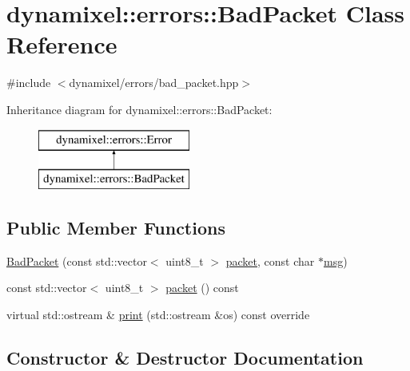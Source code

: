 \hypertarget{classdynamixel_1_1errors_1_1_bad_packet}{}\section{dynamixel\+:\+:errors\+:\+:Bad\+Packet Class Reference}
\label{classdynamixel_1_1errors_1_1_bad_packet}


{\ttfamily \#include $<$dynamixel/errors/bad\+\_\+packet.\+hpp$>$}

Inheritance diagram for dynamixel\+:\+:errors\+:\+:Bad\+Packet\+:\begin{figure}[H]
\begin{center}
\leavevmode
\includegraphics[height=2.000000cm]{classdynamixel_1_1errors_1_1_bad_packet}
\end{center}
\end{figure}
\subsection*{Public Member Functions}
\begin{DoxyCompactItemize}
\item 
\hyperlink{classdynamixel_1_1errors_1_1_bad_packet_a385334ee5fc394f31a81136372e98a60}{Bad\+Packet} (const std\+::vector$<$ uint8\+\_\+t $>$ \hyperlink{classdynamixel_1_1errors_1_1_bad_packet_aaf00423aacd71b96254eb2c4a724400c}{packet}, const char $\ast$\hyperlink{classdynamixel_1_1errors_1_1_error_a4c0804f137545e62204c49fca4c30dcb}{msg})
\item 
const std\+::vector$<$ uint8\+\_\+t $>$ \hyperlink{classdynamixel_1_1errors_1_1_bad_packet_aaf00423aacd71b96254eb2c4a724400c}{packet} () const 
\item 
virtual std\+::ostream \& \hyperlink{classdynamixel_1_1errors_1_1_bad_packet_af0b78897b3dc6d5455a0581ad587771a}{print} (std\+::ostream \&os) const override
\end{DoxyCompactItemize}


\subsection{Constructor \& Destructor Documentation}
\hypertarget{classdynamixel_1_1errors_1_1_bad_packet_a385334ee5fc394f31a81136372e98a60}{}

